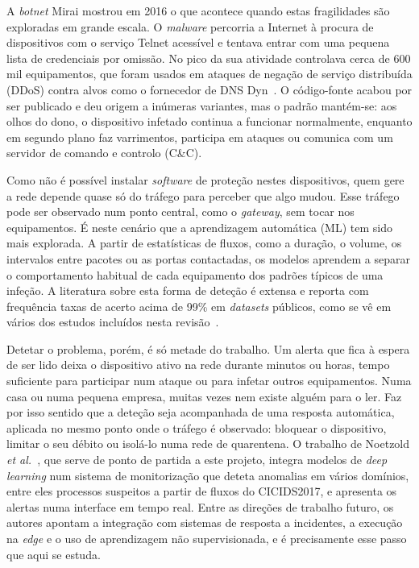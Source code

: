 \documentclass[conference,a4paper]{IEEEtran}
\begin{document}
A \textit{botnet} Mirai mostrou em 2016 o que acontece quando estas fragilidades são
exploradas em grande escala. O \textit{malware} percorria a Internet à procura de
dispositivos com o serviço Telnet acessível e tentava entrar com uma pequena lista de
credenciais por omissão. No pico da sua atividade controlava cerca de 600 mil
equipamentos, que foram usados em ataques de negação de serviço distribuída (DDoS)
contra alvos como o fornecedor de DNS Dyn~\cite{antonakakis2017mirai}. O código-fonte
acabou por ser publicado e deu origem a inúmeras variantes, mas o padrão mantém-se: aos
olhos do dono, o dispositivo infetado continua a funcionar normalmente, enquanto em
segundo plano faz varrimentos, participa em ataques ou comunica com um servidor de
comando e controlo (C\&C).

Como não é possível instalar \textit{software} de proteção nestes dispositivos, quem
gere a rede depende quase só do tráfego para perceber que algo mudou. Esse tráfego pode
ser observado num ponto central, como o \textit{gateway}, sem tocar nos equipamentos. É
neste cenário que a aprendizagem automática (ML) tem sido mais explorada. A partir de
estatísticas de fluxos, como a duração, o volume, os intervalos entre pacotes ou as
portas contactadas, os modelos aprendem a separar o comportamento habitual de cada
equipamento dos padrões típicos de uma infeção. A literatura sobre esta forma de deteção
é extensa e reporta com frequência taxas de acerto acima de 99\% em \textit{datasets}
públicos, como se vê em vários dos estudos incluídos nesta
revisão~\cite{ravi2020semisupervised,elsayed2024mpguard,toony2024multiblock,gowtham2026fedmp,Iqbal2026}.

Detetar o problema, porém, é só metade do trabalho. Um alerta que fica à espera de ser
lido deixa o dispositivo ativo na rede durante minutos ou horas, tempo suficiente para
participar num ataque ou para infetar outros equipamentos. Numa casa ou numa pequena
empresa, muitas vezes nem existe alguém para o ler. Faz por isso sentido que a deteção
seja acompanhada de uma resposta automática, aplicada no mesmo ponto onde o tráfego é
observado: bloquear o dispositivo, limitar o seu débito ou isolá-lo numa rede de
quarentena. O trabalho de Noetzold \textit{et al.}~\cite{noetzold2026anomaly}, que serve
de ponto de partida a este projeto, integra modelos de \textit{deep learning} num sistema
de monitorização que deteta anomalias em vários domínios, entre eles processos suspeitos
a partir de fluxos do CICIDS2017, e apresenta os alertas numa interface em tempo real.
Entre as direções de trabalho futuro, os autores apontam a integração com sistemas de
resposta a incidentes, a execução na \textit{edge} e o uso de aprendizagem não
supervisionada, e é precisamente esse passo que aqui se estuda.
\end{document}
